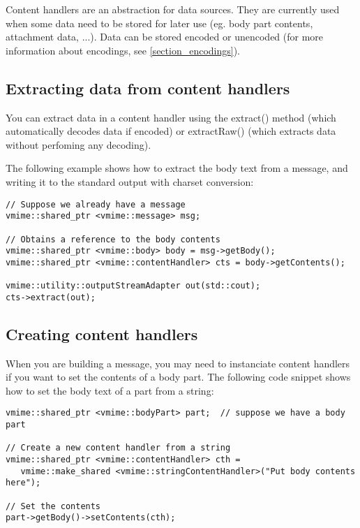 Content handlers are an abstraction for data sources. They are currently used
when some data need to be stored for later use (eg. body part contents,
attachment data, ...). Data can be stored encoded or unencoded (for more
information about encodings, see \ref{section_encodings}).

\subsection{Extracting data from content handlers} %

You can extract data in a content handler using the {\vcode extract()} method
(which automatically decodes data if encoded) or {\vcode extractRaw()} (which
extracts data without perfoming any decoding).

The following example shows how to extract the body text from a message, and
writing it to the standard output with charset conversion:

\begin{lstlisting}[caption={Using content handlers to extract body text from
a message}]
// Suppose we already have a message
vmime::shared_ptr <vmime::message> msg;

// Obtains a reference to the body contents
vmime::shared_ptr <vmime::body> body = msg->getBody();
vmime::shared_ptr <vmime::contentHandler> cts = body->getContents();

vmime::utility::outputStreamAdapter out(std::cout);
cts->extract(out);
\end{lstlisting}



\subsection{Creating content handlers} %

When you are building a message, you may need to instanciate content handlers
if you want to set the contents of a body part. The following code snippet
shows how to set the body text of a part from a string:

\begin{lstlisting}[caption={Setting the contents of a body part}]
vmime::shared_ptr <vmime::bodyPart> part;  // suppose we have a body part

// Create a new content handler from a string
vmime::shared_ptr <vmime::contentHandler> cth =
   vmime::make_shared <vmime::stringContentHandler>("Put body contents here");

// Set the contents
part->getBody()->setContents(cth);
\end{lstlisting}

